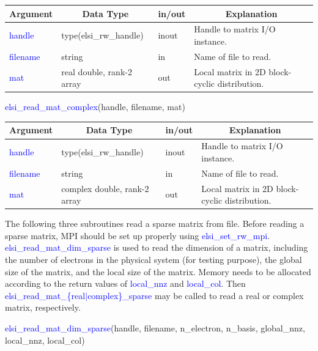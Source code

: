 \documentclass{report}
\newcommand{\tcb}[1]{\textcolor{blue}{#1}}
\begin{document}
\begin{tabular}[]{|p{20mm}|p{45mm}|p{15mm}|p{85mm}|}
\hline
\multicolumn{1}{|c|}{\textbf{Argument}} & \multicolumn{1}{c|}{\textbf{Data Type}} & \multicolumn{1}{c|}{\textbf{in/out}} & \multicolumn{1}{c|}{\textbf{Explanation}}\\
\hline
\tcb{handle}   & type(elsi\_rw\_handle)    & inout & Handle to matrix I/O instance.\\
\hline
\tcb{filename} & string                    & in    & Name of file to read.\\
\hline
\tcb{mat}      & real double, rank-2 array & out   & Local matrix in 2D block-cyclic distribution.\\
\hline
\end{tabular}

\begin{labeling}{\hspace{6cm}}
\item [\hspace{0.3cm} \tcb{elsi\_read\_mat\_complex}(handle, filename, mat)]
\end{labeling}

\begin{tabular}[]{|p{20mm}|p{45mm}|p{15mm}|p{85mm}|}
\hline
\multicolumn{1}{|c|}{\textbf{Argument}} & \multicolumn{1}{c|}{\textbf{Data Type}} & \multicolumn{1}{c|}{\textbf{in/out}} & \multicolumn{1}{c|}{\textbf{Explanation}}\\
\hline
\tcb{handle}   & type(elsi\_rw\_handle)       & inout & Handle to matrix I/O instance.\\
\hline
\tcb{filename} & string                       & in    & Name of file to read.\\
\hline
\tcb{mat}      & complex double, rank-2 array & out   & Local matrix in 2D block-cyclic distribution.\\
\hline
\end{tabular}

The following three subroutines read a sparse matrix from file. Before reading a sparse matrix, MPI should be set up properly using \tcb{elsi\_set\_rw\_mpi}. \tcb{elsi\_read\_mat\_dim\_sparse} is used to read the dimension of a matrix, including the number of electrons in the physical system (for testing purpose), the global size of the matrix, and the local size of the matrix. Memory needs to be allocated according to the return values of \tcb{local\_nnz} and \tcb{local\_col}. Then \tcb{elsi\_read\_mat\_\{real$\vert$complex\}\_sparse} may be called to read a real or complex matrix, respectively.
\begin{labeling}{\hspace{6cm}}
\item [\hspace{0.3cm} \tcb{elsi\_read\_mat\_dim\_sparse}(handle, filename, n\_electron, n\_basis, global\_nnz, local\_nnz, local\_col)]
\end{labeling}
\end{document}
